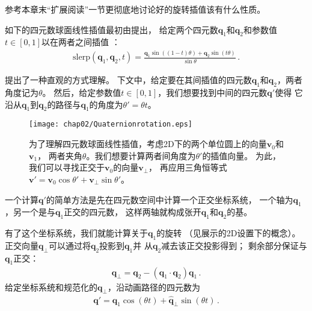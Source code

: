 参考本章末“扩展阅读”一节更彻底地讨论好的旋转插值该有什么性质。

如下的四元数球面线性插值最初由\citet{10.1145/325334.325242}提出，
给定两个四元数$\bm q_1$和$\bm q_2$和参数值$t\in[0,1]$以在两者之间插值
：
\begin{align*}
    \mathrm{slerp}(\bm q_1,\bm q_2,t)=\frac{\bm q_1\sin((1-t)\theta)+\bm q_2\sin(t\theta)}{\sin\theta}\, .
\end{align*}

\citet{Blow_2004}提出了一种直观的方式理解。
下文中，给定要在其间插值的四元数$\bm q_1$和$\bm q_2$，两者角度记为$\theta$。
然后，给定参数值$t\in[0,1]$，我们想要找到中间的四元数$\bm q'$使得
它沿从$\bm q_1$到$\bm q_2$的路径与$\bm q_1$的角度为$\theta'=\theta t$。

\begin{figure}[htbp]
    \centering\texttt{[image: chap02/Quaternionrotation.eps]}
    \caption{为了理解四元数球面线性插值，考虑2D下的两个单位圆上的向量$\bm v_0$和$\bm v_1$，
        两者夹角$\theta$。我们想要计算两者间角度为$\theta'$的插值向量。
        为此，我们可以寻找正交于$\bm v_0$的向量$\bm v_{\perp}$，
        再应用三角恒等式$\bm v'=\bm v_0\cos\theta'+\bm v_{\perp}\sin\theta'$。}
    \label{fig:2.17}
\end{figure}

一个计算$\bm q'$的简单方法是先在四元数空间中计算一个正交坐标系统，
一个轴为$\bm q_1$，另一个是与$\bm q_1$正交的四元数，
这样两轴就构成张开$\bm q_1$和$\bm q_2$的基。

有了这个坐标系统，我们就能计算关于$\bm q_1$的旋转
（见展示的2D设置下的概念）。
正交向量$\bm q_{\perp}$可以通过将$\bm q_2$投影到$\bm q_1$并
从$\bm q_2$减去该正交投影得到；
剩余部分保证与$\bm q_1$正交：
\begin{align}\label{eq:2.7}
    \bm q_{\perp}=\bm q_2-(\bm q_1\cdot\bm q_2)\bm q_1\, .
\end{align}
给定坐标系统和规范化的$\bm q_{\perp}$，沿动画路径的四元数为
\begin{align}\label{eq:2.8}
    \bm q'=\bm q_1\cos(\theta t)+\hat{\bm q}_{\perp}\sin(\theta t)\, .
\end{align}

